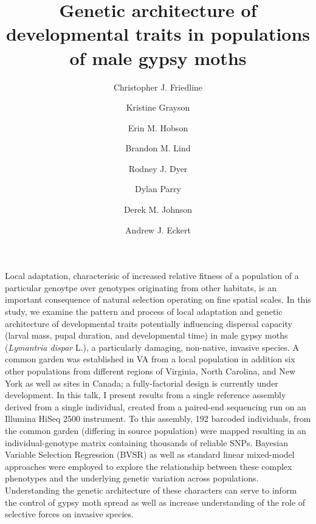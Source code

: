 \documentclass{article}
\date{}
\title{Genetic architecture of developmental traits in populations of male gypsy moths}
\author[1]{Christopher J. Friedline}
\author[1,2]{Kristine Grayson}
\author[1]{Erin M. Hobson}
\author[1]{Brandon M. Lind}
\author[1]{Rodney J. Dyer}
\author[3]{Dylan Parry}
\author[1]{Derek M. Johnson}
\author[1]{Andrew J. Eckert}
\affil[1]{Department of Biology, Virginia Commonwealth University}
\affil[2]{Deparment of Biology, University of Richmond}
\affil[3]{College of Environmental Science \& Forestry, State University of New 
York}
\begin{document}
\maketitle

\label{sec:abstract}

Local adaptation, characterisic of increased relative fitness
of a population of a particular genoytpe over genotypes originating from
other habitats, is an important consequence of natural selection
operating on fine spatial scales.  In this study, we examine the
pattern and process of local adaptation and genetic architecture of
developmental traits potentially influencing dispersal capacity
(larval mass, pupal duration, and developmental time) in male gypsy
moths (\textit{Lymantria dispar} L.), a particularly damaging,
non-native, invasive species.  A common garden was established in VA
from a local population in addition six other populations from
different regions of Virginia, North Carolina, and New York as well as
sites in Canada; a fully-factorial design is currently under
development.  In this talk, I present results from a single reference
assembly derived from a single individual, created from a paired-end
sequencing run on an Illumina HiSeq 2500 instrument.  To this
assembly, 192 barcoded individuals, from the common garden (differing
in source population) were mapped resulting in an individual-genotype
matrix containing thousands of reliable SNPs.  Bayesian Variable
Selection Regression (BVSR) as well as standard linear mixed-model
approaches were employed to explore the relationship between these
complex phenotypes and the underlying genetic variation across
populations. Understanding the genetic architecture of these
characters can serve to inform the control of gypsy moth spread as
well as increase understanding of the role of selective forces on
invasive species.
\end{document}

